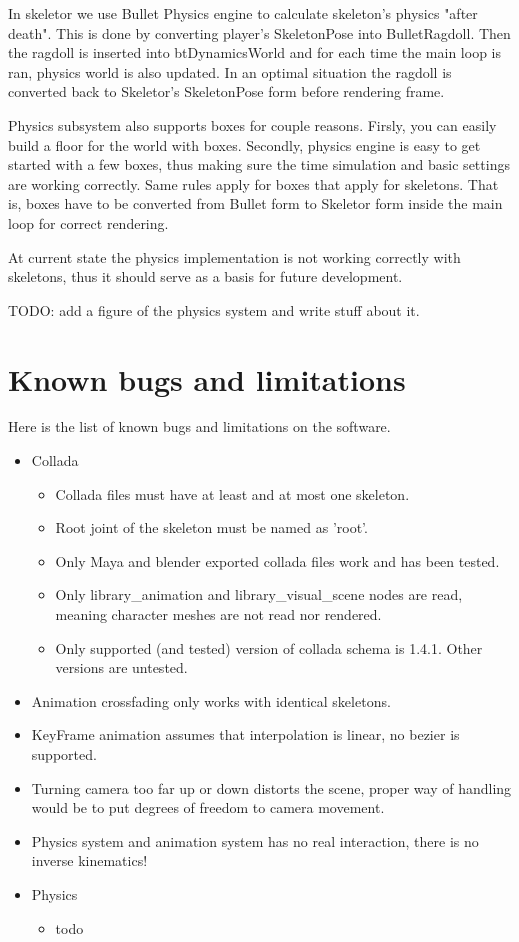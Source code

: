 \documentclass[11pt,twoside,a4paper]{article}
\begin{document}
In skeletor we use Bullet Physics engine to calculate skeleton's physics "after death". This is done by converting player's SkeletonPose into BulletRagdoll. Then the ragdoll is inserted into btDynamicsWorld and for each time the main loop is ran, physics world is also updated. In an optimal situation the ragdoll is converted back to Skeletor's SkeletonPose form before rendering frame.

Physics subsystem also supports boxes for couple reasons. Firsly, you can easily build a floor for the world with boxes. Secondly, physics engine is easy to get started with a few boxes, thus making sure the time simulation and basic settings are working correctly. Same rules apply for boxes that apply for skeletons. That is, boxes have to be converted from Bullet form to Skeletor form inside the main loop for correct rendering.

At current state the physics implementation is not working correctly with skeletons, thus it should serve as a basis for future development.

TODO: add a figure of the physics system and write stuff about it.

\section{Known bugs and limitations}

Here is the list of known bugs and limitations on the software.

\begin{itemize}
  \item Collada
  \begin{itemize}
    \item Collada files must have at least and at most one skeleton.
    \item Root joint of the skeleton must be named as 'root'.
    \item Only Maya and blender exported collada files work and has been tested.
    \item Only library\_animation and library\_visual\_scene nodes are read, meaning character meshes are not read nor rendered.
    \item Only supported (and tested) version of collada schema is 1.4.1. Other versions are untested.
  \end{itemize}
  \item Animation crossfading only works with identical skeletons.
  \item KeyFrame animation assumes that interpolation is linear, no bezier is supported.
  \item Turning camera too far up or down distorts the scene, proper way of handling would be to put degrees of freedom to camera movement.
  \item Physics system and animation system has no real interaction, there is no inverse kinematics!
  \item Physics
  \begin{itemize}
    \item todo
  \end{itemize}
\end{itemize}
\end{document}
